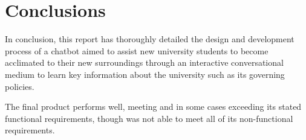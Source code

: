 \chapter{Conclusions}

In conclusion, this report has thoroughly detailed the design and development process of a chatbot aimed to assist new university students 
to become acclimated to their new surroundings through an interactive conversational medium to learn key information about the university 
such as its governing policies.

\para The final product performs well, meeting and in some cases exceeding its stated functional requirements, though was not 
able to meet all of its non-functional requirements.  